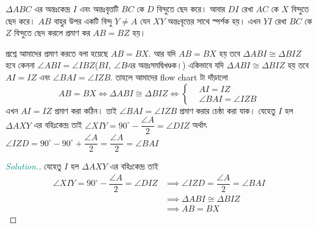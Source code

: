 \documentclass[a4paper,11pt]{article}
\newcommand{\drg}{^{\circ}}
\newenvironment{sltn}{\begin{proof}[\emph{\textcolor{darkcyan}{Solution.}}]} {\end{proof}}
\begin{document}
\begin{xmpl}
	$\Delta ABC$ এর অন্তঃকেন্দ্র $I$ এবং অন্তঃবৃত্তটি $BC$ কে $D$ বিন্দুতে ছেদ করে। আবার $DI$ রেখা $AC$ কে $X$ বিন্দুতে ছেদ করে। $AB$ বাহুর উপর একটি বিন্দু $Y\neq A$ যেন $XY$ অন্তঃবৃত্তের সাথে স্পর্শক হয়। এখন $YI$ রেখা $BC$ কে $Z$ বিন্দুতে ছেদ করলে প্রমাণ কর $AB=BZ$ হয়। 
\end{xmpl}
\begin{figure}[h]
	\centering
\end{figure}
প্রশ্নে আমাদের প্রমাণ করতে বলা হয়েছে $AB=BX$. আর যদি $AB=BX$ হয় তবে $\Delta ABI \cong \Delta BIZ$ হবে কেননা $\angle ABI=\angle IBZ$($BI, \ \angle B$এর অন্তঃসমদ্বিখণ্ডক।) একিভাবে যদি $\Delta ABI \cong \Delta BIZ$ হয় তবে $AI=IZ$ এবং $\angle BAI=\angle IZB$. তাহলে আমাদের flow chart টা দাঁড়ালো 
\begin{equation*}
	AB=BX \iff \Delta ABI \cong \Delta BIZ \iff \begin{cases}
		& AI=IZ\\
		& \angle BAI=\angle IZB
	  \end{cases}
\end{equation*}
এখন $AI=IZ$ প্রমাণ করা কঠিন। তাই $\angle BAI=\angle IZB$ প্রমাণ করার চেষ্ঠা করা যাক। যেহেতু $I$ হল $\Delta AXY$ এর বহিঃকেন্দ্র তাই $\angle XIY=90\drg-\dfrac{\angle A}{2}=\angle DIZ$ অর্থাৎ $\angle IZD=90\drg-90\drg+\dfrac{\angle A}{2}=\dfrac{\angle A}{2}=\angle BAI$ 
\begin{sltn}
	যেহেতু $I$ হল $\Delta AXY$ এর বহিঃকেন্দ্র তাই
	\begin{align*}
		\angle XIY=90\drg-\dfrac{\angle A}{2}=\angle DIZ &\implies \angle IZD=\dfrac{\angle A}{2}=\angle BAI \\ 
		&\implies \Delta ABI \cong \Delta BIZ \\ 
		&\implies AB=BX
	\end{align*}
\end{sltn}
\end{document}
